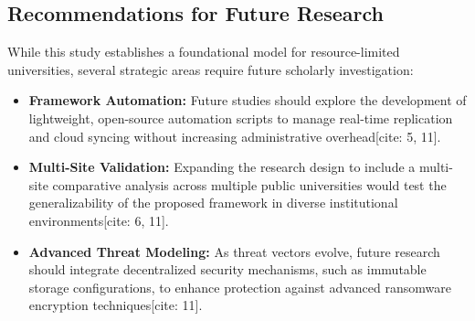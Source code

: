 \documentclass[journal,onecolumn,12pt,twoside]{IEEEtran}
\begin{document}
	\subsection{Recommendations for Future Research}
	\label{subsec:future_research}
	While this study establishes a foundational model for resource-limited universities, several strategic areas require future scholarly investigation:
	\begin{itemize}
		\item \textbf{Framework Automation:} Future studies should explore the development of lightweight, open-source automation scripts to manage real-time replication and cloud syncing without increasing administrative overhead[cite: 5, 11].
		\item \textbf{Multi-Site Validation:} Expanding the research design to include a multi-site comparative analysis across multiple public universities would test the generalizability of the proposed framework in diverse institutional environments[cite: 6, 11].
		\item \textbf{Advanced Threat Modeling:} As threat vectors evolve, future research should integrate decentralized security mechanisms, such as immutable storage configurations, to enhance protection against advanced ransomware encryption techniques[cite: 11].
	\end{itemize}
	
	
	\newpage
	
	
	
\end{document}
